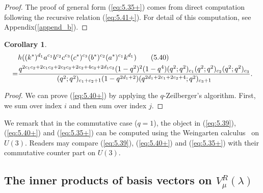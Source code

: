 \documentclass[table,a4paper,reqno]{amsart}
\numberwithin{equation}{section}
\newtheorem{corollary}[theorem]{Corollary}
\theoremstyle{definition}
\begin{document}
\begin{proof}
    The proof of general form (\ref{eq:5.35+}) comes from direct computation following the recursive relation (\ref{eq:5.41+}). For detail of this computation, see Appendix(\ref{append_b}).
\end{proof}
\begin{corollary}
    \begin{align}\label{eq:5.40+}\stepcounter{equation}
            &h((k^*)^{d_1}a^{c_1}b^{c_2}c^{c_3}(c^*)^{c_3}(b^*)^{c_2}(a^*)^{c_1}k^{d_1})\tag{5.40}\\
            =&\frac{q^{2c_1c_2+2c_1c_3+2c_2c_3+2c_2+4c_3+2d_1c_3}(1-q^2)^2(1-q^4)(q^2;q^2)_{c_1}(q^2;q^2)_{c_2}(q^2;q^2)_{c_3}}{(q^2;q^2)_{c_1+c_2+1}(1-q^{2d_1+2})(q^{2d_1+2c_1+2c_2+4};q^2)_{c_3+1}}.\notag
    \end{align}
\end{corollary}
\begin{proof}
    We can prove (\ref{eq:5.40+}) by applying the $q$-Zeilberger's algorithm. First, we sum over index $i$ and then sum over index $j$.
\end{proof}
We remark that in the commutative case ($q=1$), the object in (\ref{eq:5.39}), (\ref{eq:5.40+}) and (\ref{eq:5.35+}) can be computed using the Weingarten calculus~\cite{collins2003moments} on $U(3)$. Readers may compare (\ref{eq:5.39}), (\ref{eq:5.40+}) and (\ref{eq:5.35+}) with their commutative counter part on $U(3)$.

\subsection{The inner products of basis vectors on $V^R_\mu(\lambda)$}
\end{document}

